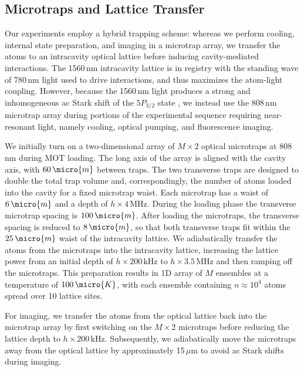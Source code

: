 \documentclass[aps,pra,superscriptaddress,12pt]{revtex4-1} %
\begin{document}
\begin{bibunit}
\subsection{Microtraps and Lattice Transfer}
Our experiments employ a hybrid trapping scheme: whereas we perform cooling, internal state preparation, and imaging in a microtrap array, we transfer the atoms to an intracavity optical lattice before inducing cavity-mediated interactions.  The 1560\,nm intracavity lattice is in registry with the standing wave of 780\,nm light used to drive interactions, and thus maximizes the atom-light coupling.  However, because the 1560\,nm light produces a strong and inhomogeneous ac Stark shift of the $5P_{3/2}$ state \cite{lee2014many}, we instead use the 808\,nm microtrap array during portions of the experimental sequence requiring near-resonant light, namely cooling, optical pumping, and fluorescence imaging.

We initially turn on a two-dimensional array of $M\times 2$ optical microtraps at 808\,nm during MOT loading.  The long axis of the array is aligned with the cavity axis, with $60\,\micro{m}$ between traps.  The two transverse traps are designed to double the total trap volume and, correspondingly, the number of atoms loaded into the cavity for a fixed microtrap waist.  Each microtrap has a waist of $6\,\micro{m}$ and a depth of $h\times 4\,\text{MHz}$.   During the loading phase the transverse microtrap spacing is $100\,\micro{m}$.  After loading the microtraps, the transverse spacing is reduced to $8\,\micro{m}$, so that both transverse traps fit within the $25\,\micro{m}$ waist of the intracavity lattice. We adiabatically transfer the atoms from the microtraps into the intracavity lattice, increasing the lattice power from an initial depth of $h\times 200\,\text{kHz}$ to $h\times 3.5\,\text{MHz}$ and then ramping off the microtraps. This preparation results in 1D array of $M$ ensembles at a temperature of $100\,\micro{K}$, with each ensemble containing $n \approx 10^4$ atoms spread over 10 lattice sites. 

For imaging, we transfer the atoms from the optical lattice back into the microtrap array by first switching on the $M\times 2$ microtraps before reducing the lattice depth to $h\times 200\,$kHz. Subsequently, we adiabatically move the microtraps away from the optical lattice by approximately 15\,$\mu$m to avoid ac Stark shifts during imaging.


\end{bibunit}
\end{document}
